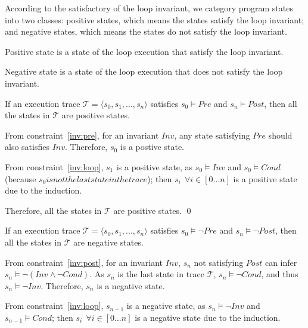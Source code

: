 According to the satisfactory of the loop invariant,
we category program states into two classes:
positive states, which means the states satisfy the loop invariant;
and negative states, which means the states do not satisfy the loop invariant.
\begin{definition}
Positive state is a state of the loop execution that satisfy the loop invariant.
\end{definition}
\begin{definition}
Negative state is a state of the loop execution that does not satisfy the loop invariant.
\end{definition}

\begin{theorem}
If an execution trace $\mathcal{T} = \langle s_0, s_1, ..., s_n\rangle$ satisfies $s_0 \models Pre$ and $s_n \models Post$,
then all the states in $\mathcal{T}$ are positive states.
\end{theorem}

From constraint~\ref{inv:pre}, for an invariant $Inv$,
any state satisfying $Pre$ should also satisfies $Inv$.
Therefore, $s_0$ is a postive state.

From constraint~\ref{inv:loop}, $s_1$ is a positive state, as $s_0 \models Inv$
and  $s_0 \models Cond$ (because $s_0 is not the last state in the trace$);
then $s_i~~\forall i \in [0...n]$ is a positive state due to the induction.

Therefore, all the states in $\mathcal{T}$ are positive states. \hfill \qed



\begin{theorem}
If an execution trace $\mathcal{T} = \langle s_0, s_1, ..., s_n\rangle$ satisfies $s_0 \models \neg Pre$ and $s_n \models \neg Post$,
then all the states in $\mathcal{T}$ are negative states.
\end{theorem}
From constraint~\ref{inv:post}, for an invariant $Inv$,
$s_n$ not satisfying $Post$ can infer $s_n \models \neg(Inv \wedge \neg Cond)$.
As $s_n$ is the last state in trace $\mathcal{T}$, $s_n \models \neg Cond$, and thus $s_n \models \neg Inv$.
Therefore, $s_n$ is a negative state.

From constraint~\ref{inv:loop}, $s_{n-1}$ is a negative state, as $s_n \models \neg Inv$ and $s_{n-1} \models Cond$;
then $s_i~~\forall i \in [0...n]$ is a negative state due to the induction.

